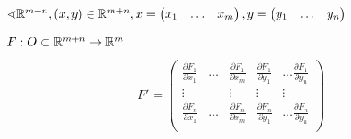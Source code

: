 

\cfoot{}



$\sphericalangle \mathbb{R}^{m+n}, (x, y) \in\mathbb{R}^{m+n}, x=\begin{pmatrix}
        x_1 & \ldots & x_m
    \end{pmatrix}, y = \begin{pmatrix}
        y_1 & \ldots & y_n
    \end{pmatrix}$

$F : O\subset\mathbb{R}^{m+n} \to\mathbb{R}^m$

$$F' = \begin{pmatrix}
        \frac{\partial F_1}{\partial x_1} & \ldots & \frac{\partial F_1}{\partial x_m} & \frac{\partial F_1}{\partial y_1} & \ldots \frac{\partial F_1}{\partial y_n} \\
        \vdots                            &        & \vdots                            & \vdots                            & \vdots                                   \\
        \frac{\partial F_n}{\partial x_1} & \ldots & \frac{\partial F_n}{\partial x_m} & \frac{\partial F_n}{\partial y_1} & \ldots \frac{\partial F_n}{\partial y_n} \\
    \end{pmatrix}$$

